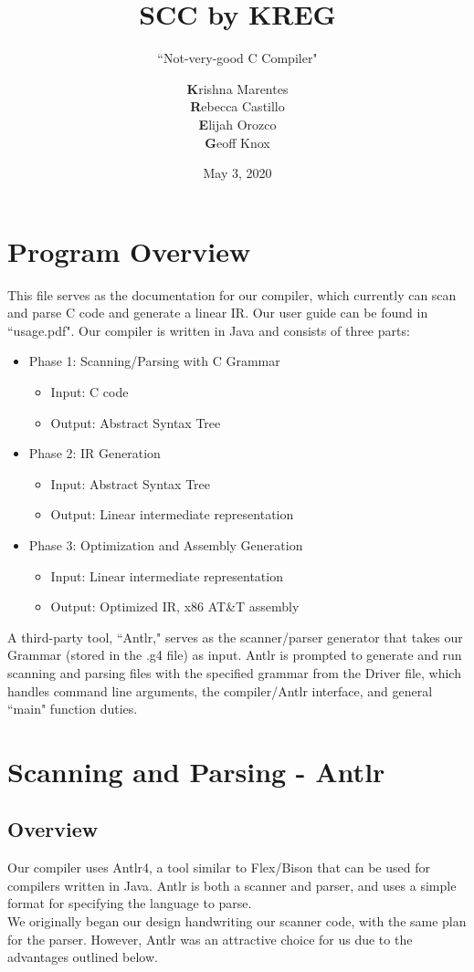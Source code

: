 \documentclass{scrartcl}
\title{SCC by KREG}
\subtitle{``Not-very-good C Compiler"}
\author{\textbf{K}rishna Marentes\\\textbf{R}ebecca Castillo\\\textbf{E}lijah Orozco\\\textbf{G}eoff Knox}
\date{May 3, 2020}
\begin{document}
\maketitle
\tableofcontents

\section{Program Overview}
This file serves as the documentation for our compiler, which currently can scan and parse C code and generate a linear IR. Our user guide can be found in ``usage.pdf". Our compiler is written in Java and consists of three parts:
\begin{itemize}
    \item Phase 1: Scanning/Parsing with C Grammar
    \begin{itemize}
        \item Input: C code
        \item Output: Abstract Syntax Tree
    \end{itemize}
    \item Phase 2: IR Generation
    \begin{itemize}
        \item Input: Abstract Syntax Tree
        \item Output: Linear intermediate representation
    \end{itemize}
    \item Phase 3: Optimization and Assembly Generation
    \begin{itemize}
        \item Input: Linear intermediate representation
        \item Output: Optimized IR, x86 AT\&T assembly
    \end{itemize}
\end{itemize}
A third-party tool, ``Antlr," serves as the scanner/parser generator that takes our Grammar (stored in the .g4 file) as input. Antlr is prompted to generate and run scanning and parsing files with the specified grammar from the Driver file, which handles command line arguments, the compiler/Antlr interface, and general ``main" function duties.

\section{Scanning and Parsing - Antlr}
\subsection{Overview}
Our compiler uses Antlr4, a tool similar to Flex/Bison that can be used for compilers written in Java. Antlr is both a scanner and parser, and uses a simple format for specifying the language to parse.\\
We originally began our design handwriting our scanner code, with the same plan for the parser. However, Antlr was an attractive choice for us due to the advantages outlined below.
\end{document}

